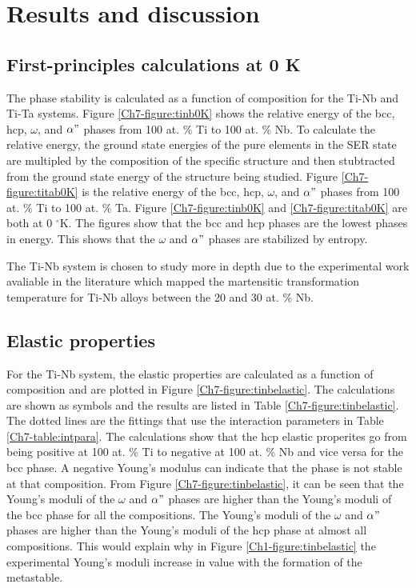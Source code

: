 \section{Results and discussion}

\subsection{First-principles calculations at 0 K}

The phase stability is calculated as a function of composition for the Ti-Nb and Ti-Ta systems. Figure \ref{Ch7-figure:tinb0K} shows the relative energy of the bcc, hcp, $\omega$, and $\alpha"$ phases from 100 at. \% Ti to 100 at. \% Nb. To calculate the relative energy, the ground state energies of the pure elements in the SER state are multipled by the composition of the specific structure and then stubtracted from the ground state energy of the structure being studied. Figure \ref{Ch7-figure:titab0K} is the relative energy of the bcc, hcp, $\omega$, and $\alpha"$ phases from 100 at. \% Ti to 100 at. \% Ta. Figure \ref{Ch7-figure:tinb0K} and \ref{Ch7-figure:titab0K} are both at 0 $^\circ$K. The figures show that the bcc and hcp phases are the lowest phases in energy. This shows that the $\omega$ and $\alpha"$ phases are stabilized by entropy.

The Ti-Nb system is chosen to study more in depth due to the experimental work avaliable in the literature which mapped the martensitic transformation temperature for Ti-Nb alloys between the 20 and 30 at. \% Nb.

\subsection{Elastic properties}

For the Ti-Nb system, the elastic properties are calculated as a function of composition and are plotted in Figure \ref{Ch7-figure:tinbelastic}. The calculations are shown as symbols and the results are listed in Table \ref{Ch7-figure:tinbelastic}. The dotted lines are the fittings that use the interaction parameters in Table \ref{Ch7-table:intpara}. The calculations show that the hcp elastic properites go from being positive at 100 at. \% Ti to negative at 100 at. \% Nb and vice versa for the bcc phase. A negative Young's modulus can indicate that the phase is not stable at that composition. From Figure \ref{Ch7-figure:tinbelastic}, it can be seen that the Young's moduli of the $\omega$ and $\alpha"$ phases are higher than the Young's moduli of the bcc phase for all the compositions. The Young's moduli of the $\omega$ and $\alpha"$ phases are higher than the Young's moduli of the hcp phase at almost all compositions. This would explain why in Figure \ref{Ch1-figure:tinbelastic} the experimental Young's moduli increase in value with the formation of the metastable. 

